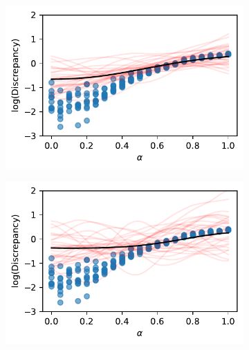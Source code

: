 \begin{figure}[htbp]
    \centering
    \begin{subfigure}[b]{0.5\textwidth}
        \centering
        \includegraphics[width=\textwidth]{
            ../champagne_GP_images/initial_alpha_slice_log_discrep.pdf
        }
    \end{subfigure}%
    \hfill%
    \begin{subfigure}[b]{0.5\textwidth}
        \centering
        \includegraphics[width=\textwidth]{
            ../champagne_GP_images/alpha_slice_100_bolfi_updates_log_discrep.pdf
        }
    \end{subfigure}
    \hfill%
    \begin{subfigure}[b]{0.5\textwidth}
        \centering

\end{subfigure}
\end{figure}
